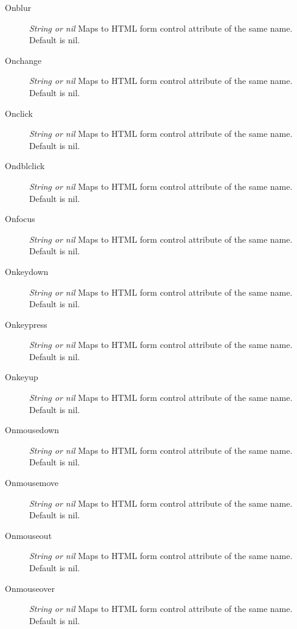 \documentclass [11pt]{book}
\begin{document}
\begin{itemize}
\begin{description}
\item [Onblur]
\emph{String or nil} Maps to HTML form control attribute of the same name. Default is nil.


\item [Onchange]
\emph{String or nil} Maps to HTML form control attribute of the same name. Default is nil.


\item [Onclick]
\emph{String or nil} Maps to HTML form control attribute of the same name. Default is nil.


\item [Ondblclick]
\emph{String or nil} Maps to HTML form control attribute of the same name. Default is nil.


\item [Onfocus]
\emph{String or nil} Maps to HTML form control attribute of the same name. Default is nil.


\item [Onkeydown]
\emph{String or nil} Maps to HTML form control attribute of the same name. Default is nil.


\item [Onkeypress]
\emph{String or nil} Maps to HTML form control attribute of the same name. Default is nil.


\item [Onkeyup]
\emph{String or nil} Maps to HTML form control attribute of the same name. Default is nil.


\item [Onmousedown]
\emph{String or nil} Maps to HTML form control attribute of the same name. Default is nil.


\item [Onmousemove]
\emph{String or nil} Maps to HTML form control attribute of the same name. Default is nil.


\item [Onmouseout]
\emph{String or nil} Maps to HTML form control attribute of the same name. Default is nil.


\item [Onmouseover]
\emph{String or nil} Maps to HTML form control attribute of the same name. Default is nil.



\end{description}
\end{itemize}
\end{document}
